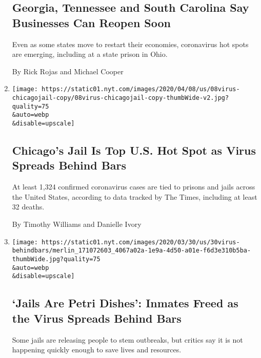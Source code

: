 \begin{enumerate}
{  \subsection{Georgia, Tennessee and South Carolina Say Businesses Can
  Reopen
  Soon}\label{georgia-tennessee-and-south-carolina-say-businesses-can-reopen-soon}}

  Even as some states move to restart their economies, coronavirus hot
  spots are emerging, including at a state prison in Ohio.

  By Rick Rojas and Michael Cooper
\item
  \href{/2020/04/08/us/coronavirus-cook-county-jail-chicago.html}{}

  \texttt{[image: https://static01.nyt.com/images/2020/04/08/us/08virus-chicagojail-copy/08virus-chicagojail-copy-thumbWide-v2.jpg?quality=75\\\&auto=webp\\\&disable=upscale]}

  \hypertarget{chicagos-jail-is-top-us-hot-spot-as-virus-spreads-behind-bars}{%
  \subsection{Chicago's Jail Is Top U.S. Hot Spot as Virus Spreads
  Behind
  Bars}\label{chicagos-jail-is-top-us-hot-spot-as-virus-spreads-behind-bars}}

  At least 1,324 confirmed coronavirus cases are tied to prisons and
  jails across the United States, according to data tracked by The
  Times, including at least 32 deaths.

  By Timothy Williams and Danielle Ivory
\item
  \href{/2020/03/30/us/coronavirus-prisons-jails.html}{}

  \texttt{[image: https://static01.nyt.com/images/2020/03/30/us/30virus-behindbars/merlin\_171072603\_4067a02a-1e9a-4d50-a01e-f6d3e310b5ba-thumbWide.jpg?quality=75\\\&auto=webp\\\&disable=upscale]}

  \hypertarget{jails-are-petri-dishes-inmates-freed-as-the-virus-spreads-behind-bars}{%
  \subsection{`Jails Are Petri Dishes': Inmates Freed as the Virus
  Spreads Behind
  Bars}\label{jails-are-petri-dishes-inmates-freed-as-the-virus-spreads-behind-bars}}

  Some jails are releasing people to stem outbreaks, but critics say it
  is not happening quickly enough to save lives and resources.


\end{enumerate}
